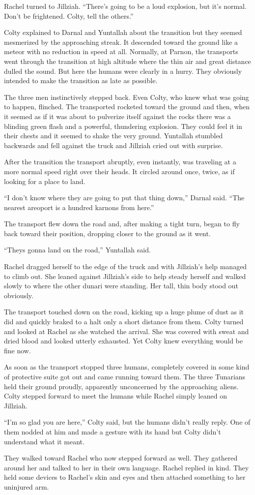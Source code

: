 Rachel turned to Jillziah. ``There's going to be a loud explosion, but it's normal. Don't be
frightened. Colty, tell the others.''

Colty explained to Darnal and Yuntallah about the transition but they seemed mesmerized by the
approaching streak. It descended toward the ground like a meteor with no reduction in speed at
all. Normally, at Parnon, the transports went through the transition at high altitude where the
thin air and great distance dulled the sound. But here the humans were clearly in a hurry. They
obviously intended to make the transition as late as possible.

The three men instinctively stepped back. Even Colty, who knew what was going to happen,
flinched. The transported rocketed toward the ground and then, when it seemed as if it was about
to pulverize itself against the rocks there was a blinding green flash and a powerful,
thundering explosion. They could feel it in their chests and it seemed to shake the very ground.
Yuntallah stumbled backwards and fell against the truck and Jillziah cried out with surprise.

After the transition the transport abruptly, even instantly, was traveling at a more normal
speed right over their heads. It circled around once, twice, as if looking for a place to land.

``I don't know where they are going to put that thing down,'' Darnal said. ``The nearest
areoport is a hundred karnons from here.''

The transport flew down the road and, after making a tight turn, began to fly back toward their
position, dropping closer to the ground as it went.

``Theys gonna land on the road,'' Yuntallah said.

Rachel dragged herself to the edge of the truck and with Jillziah's help managed to climb out.
She leaned against Jillziah's side to help steady herself and walked slowly to where the other
dunari were standing. Her tall, thin body stood out obviously.

The transport touched down on the road, kicking up a huge plume of dust as it did and quickly
braked to a halt only a short distance from them. Colty turned and looked at Rachel as she
watched the arrival. She was covered with sweat and dried blood and looked utterly exhausted.
Yet Colty knew everything would be fine now.

As soon as the transport stopped three humans, completely covered in some kind of protective
suite got out and came running toward them. The three Tunarians held their ground proudly,
apparently unconcerned by the approaching aliens. Colty stepped forward to meet the humans while
Rachel simply leaned on Jillziah.

``I'm so glad you are here,'' Colty said, but the humans didn't really reply. One of them nodded
at him and made a gesture with its hand but Colty didn't understand what it meant.

They walked toward Rachel who now stepped forward as well. They gathered around her and talked
to her in their own language. Rachel replied in kind. They held some devices to Rachel's skin
and eyes and then attached something to her uninjured arm.
